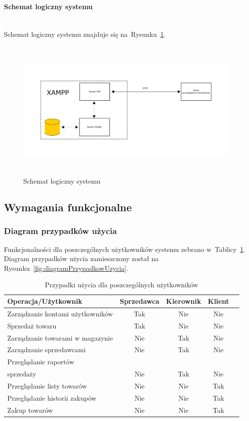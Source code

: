 \documentclass[a4paper, 12pt]{article}
\begin{document}
\paragraph{Schemat logiczny systemu} \mbox{}\\
Schemat logiczny systemu znajduje się na~Rysunku~\ref{fig:schematLogiczny}.

\begin{figure}[H]
	\includegraphics[height=7cm]{schemat.png}
	\caption[Schemat logiczny systemu]{Schemat logiczny systemu}
	\label{fig:schematLogiczny}
\end{figure}

\subsection{Wymagania funkcjonalne}
\subsubsection{Diagram przypadków użycia}
Funkcjonalności dla poszczególnych użytkowników systemu zebrano w~Tablicy~\ref{tab:tabelaPrzypadkowUzycia}.
Diagram przypadków użycia zamieszczony został na Rysunku~\ref{fig:diagramPrzypadkowUzycia}.

\begin{table}[H]
	\centering
	\caption[Tabela przypadków użycia]{Przypadki użycia dla poszczególnych użytkowników}
	\label{tab:tabelaPrzypadkowUzycia}
		\begin{tabular}{ l c c c c }
			Operacja/Użytkownik & Sprzedawca & Kierownik & Klient \\ \hline
			Zarządzanie kontami użytkowników & Tak & Nie & Nie \\ \hline
			Sprzedaż towaru & Tak & Nie & Nie \\ \hline
			Zarządzanie towarami w magazynie & Nie & Tak & Nie \\ \hline
			Zarządzanie sprzedawcami & Nie & Tak & Nie \\ \hline
			Przeglądanie raportów\\ sprzedaży & Nie & Tak & Nie \\ \hline
			Przeglądanie listy towarów & Nie & Nie & Tak \\ \hline
			Przeglądanie historii zakupów & Nie & Nie & Tak \\ \hline
			Zakup towarów & Nie & Nie & Tak \\ \hline
		\end{tabular}
\end{table}
\end{document}
